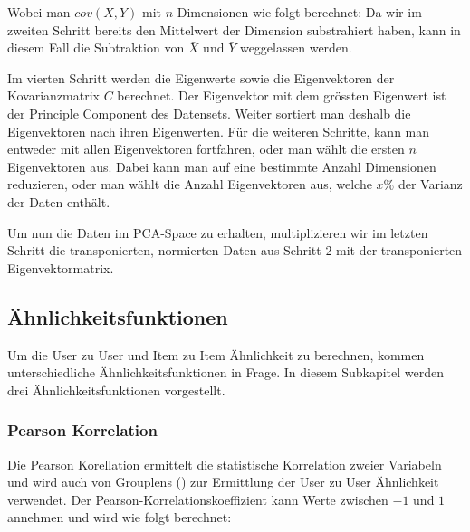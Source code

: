 Wobei man ${cov}(X,Y)$ mit $n$ Dimensionen wie folgt berechnet:
Da wir im zweiten Schritt bereits den Mittelwert der Dimension substrahiert haben, kann in diesem Fall die Subtraktion von $\bar{X}$ und $\bar{Y}$ weggelassen werden.

Im vierten Schritt werden die Eigenwerte sowie die Eigenvektoren der Kovarianzmatrix $C$ berechnet.
Der Eigenvektor mit dem grössten Eigenwert ist der Principle Component des Datensets. Weiter sortiert man deshalb die Eigenvektoren nach ihren Eigenwerten.
Für die weiteren Schritte, kann man entweder mit allen Eigenvektoren fortfahren, oder man wählt die ersten $n$ Eigenvektoren aus. Dabei kann man auf eine bestimmte Anzahl Dimensionen reduzieren, oder man wählt die Anzahl Eigenvektoren aus, welche $x\%$ der Varianz der Daten enthält.

Um nun die Daten im PCA-Space zu erhalten, multiplizieren wir im letzten Schritt die transponierten, normierten Daten aus Schritt 2 mit der transponierten Eigenvektormatrix. 



\subsection{Ähnlichkeitsfunktionen}
Um die User zu User und Item zu Item Ähnlichkeit zu berechnen, kommen unterschiedliche Ähnlichkeitsfunktionen in Frage. In diesem Subkapitel werden drei Ähnlichkeitsfunktionen vorgestellt.

\subsubsection{Pearson Korrelation}
Die Pearson Korellation ermittelt die statistische Korrelation zweier Variabeln und wird auch von Grouplens (\cite{Resnick94grouplens:an}) zur Ermittlung der User zu User Ähnlichkeit verwendet. Der Pearson-Korrelationskoeffizient kann Werte zwischen $-1$ und $1$ annehmen und wird wie folgt berechnet:


